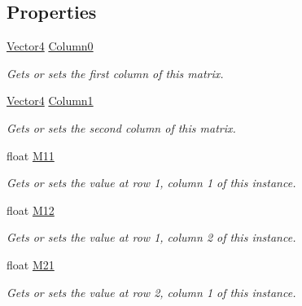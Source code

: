 \subsection*{Properties}
\begin{DoxyCompactItemize}
\item 
\hyperlink{struct_open_t_k_1_1_vector4}{Vector4} \hyperlink{struct_open_t_k_1_1_matrix4x2_aa4e6a7dccd9d6808982bbe89e11226c3}{Column0}
\begin{DoxyCompactList}\small\item\em Gets or sets the first column of this matrix. \end{DoxyCompactList}\item 
\hyperlink{struct_open_t_k_1_1_vector4}{Vector4} \hyperlink{struct_open_t_k_1_1_matrix4x2_a2dbdba90c96b8491972241c6799f6ec9}{Column1}
\begin{DoxyCompactList}\small\item\em Gets or sets the second column of this matrix. \end{DoxyCompactList}\item 
float \hyperlink{struct_open_t_k_1_1_matrix4x2_a94441ef072047b0466d1e6a25eff90ae}{M11}
\begin{DoxyCompactList}\small\item\em Gets or sets the value at row 1, column 1 of this instance. \end{DoxyCompactList}\item 
float \hyperlink{struct_open_t_k_1_1_matrix4x2_adae663c7341cf13dd704b0898d12ad26}{M12}
\begin{DoxyCompactList}\small\item\em Gets or sets the value at row 1, column 2 of this instance. \end{DoxyCompactList}\item 
float \hyperlink{struct_open_t_k_1_1_matrix4x2_a1ae21922f119e789234623ebc0cc4041}{M21}
\begin{DoxyCompactList}\small\item\em Gets or sets the value at row 2, column 1 of this instance. \end{DoxyCompactList}\item 

\end{DoxyCompactItemize}
